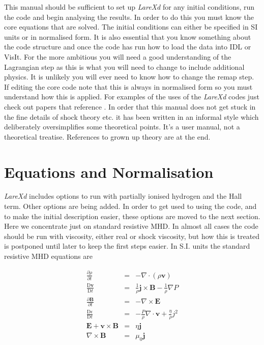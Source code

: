 \documentclass[11pt]{article}
\begin{document}
This manual should be sufficient to set up {\it LareXd} for any initial conditions, run the code and begin analysing the results. In order to do this you must know the core equations that are solved. The initial conditions can either be specified in SI units or in normalised form. It is also essential that you know something about the code structure and once the code has run how to load the data into IDL or VisIt. For the more ambitious you will need a good understanding of the Lagrangian step as this is what you will need to change to include additional physics. It is unlikely you will ever need to know how to change the remap step. If editing the core code note that this is always in normalised form so you must understand how this is applied. For examples of the uses of the {\it LareXd} codes just check out papers that reference \cite{jcp}. In order that this manual does not get stuck in the fine details of shock theory etc. it has been written in an informal style which deliberately oversimplifies some theoretical points. It's a user manual, not a theoretical treatise. References to grown up theory are at the end. 



\section{Equations and Normalisation}

{\it LareXd} includes options to run with partially ionised hydrogen and the Hall term. Other options are being added. In order to get used to using the code, and to make the initial description easier, these options are moved to the next section. Here we concentrate just on standard resistive MHD. In almost all cases the code should be run with viscosity, either real or shock viscosity, but how this is treated is postponed until later to keep the first steps easier. In S.I. units the standard resistive MHD equations are

\begin{eqnarray}
\frac{\partial \rho}{\partial t}&=&- \nabla\cdot(\rho \mathbf{v})\\
\frac{\mathrm{D}\mathbf{v}}{\mathrm{D}t}&=&\frac{1}{\rho}\mathbf{j}\times\mathbf{B}
-\frac{1}{\rho}\nabla P\\
\frac{\partial \mathbf{B}}{\partial t}&=&-\nabla\times\mathbf{E} \label{faraday}\\
\frac{\mathrm{D}\epsilon}{\mathrm{D}t}&=&-\frac{P}{\rho}\nabla\cdot\mathbf{v}+\frac
{\eta}{\rho}j^{2}\\
\mathbf{E}+\mathbf{v}\times\mathbf{B}&=&\eta \mathbf{j} \label{ohm}\\
\nabla\times\mathbf{B}&=&\mu_0 \mathbf{j}
\end{eqnarray}
\end{document}
